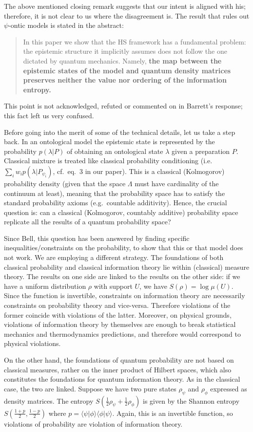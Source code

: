 \documentclass[11pt]{article}
\def\>{\rangle}
\def\<{\langle}
\begin{document}
The above mentioned closing remark suggests that our intent is aligned with his; therefore, it is not clear to us where the disagreement is. The result that rules out $\psi$-ontic models is stated in the abstract:
\begin{quote}
In this paper we show that the HS framework has a fundamental problem: the epistemic structure it implicitly assumes does not follow the one dictated by quantum mechanics. Namely, \textbf{the map between the epistemic states of the model and quantum density matrices preserves neither the value nor ordering of the information entropy.}
\end{quote}
\noindent This point is not acknowledged, refuted or commented on in Barrett's response; this fact left us very confused.

Before going into the merit of some of the technical details, let us take a step back. In an ontological model the epistemic state is represented by the probability $p(\lambda | P)$ of obtaining an ontological state $\lambda$ given a preparation $P$. Classical mixture is treated like classical probability conditioning (i.e. $\sum_i  w_i p(\lambda| P_{\psi_i})$, cf.\ eq.~3 in our paper). This is a classical (Kolmogorov) probability density (given that the space $\Lambda$ must have cardinality of the continuum at least), meaning that the probability space has to satisfy the standard probability axioms (e.g.\ countable additivity). Hence, the crucial question is: can a classical (Kolmogorov, countably additive) probability space replicate all the results of a quantum probability space?
	
	Since Bell, this question has been answered by finding specific inequalities/constraints on the probability, to show that this or that model does not work. We are employing a different strategy. The foundations of both classical probability and classical information theory lie within (classical) measure theory. The results on one side are linked to the results on the other side: if we have a uniform distribution $\rho$ with support $U$, we have $S(\rho) = \log \mu(U)$. Since the function is invertible, constraints on information theory are necessarily constraints on probability theory and vice-versa. Therefore violations of the former coincide with violations of the latter. Moreover, on physical grounds, violations of information theory by themselves are enough to break statistical mechanics and thermodynamics predictions, and therefore would correspond to physical violations.
	
	On the other hand, the foundations of quantum probability are not based on classical measures, rather on the inner product of Hilbert spaces, which also constitutes the foundations for quantum information theory. As in the classical case, the two are linked. Suppose we have two pure states $\rho_\psi$ and $\rho_\phi$ expressed as density matrices. The entropy $S(\frac{1}{2} \rho_\psi + \frac{1}{2} \rho_\phi)$ is given by the Shannon entropy $S(\frac{1+p}{2}, \frac{1-p}{2})$ where $p=\<\psi | \phi \>\<\phi | \psi\>$. Again, this is an invertible function, so violations of probability are violation of information theory.
	
\end{document}
